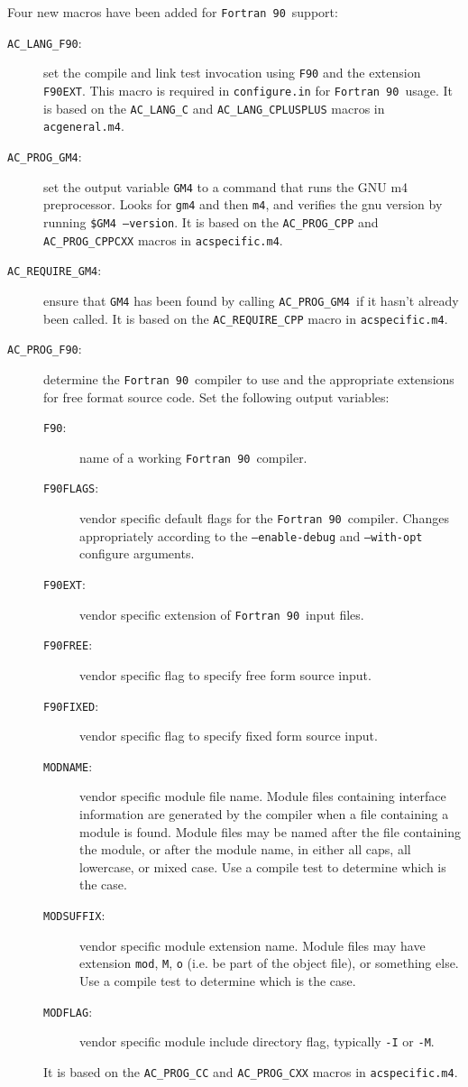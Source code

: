 \documentclass[11pt]{nmemo}
\newcommand{\fninety}{\texttt{Fortran~90}}
\newcommand{\langfninety}{\texttt{AC\_LANG\_F90}}
\newcommand{\progfninety}{\texttt{AC\_PROG\_F90}}
\newcommand{\requiregmfour}{\texttt{AC\_REQUIRE\_GM4}}
\newcommand{\proggmfour}{\texttt{AC\_PROG\_GM4}}
\begin{document}
Four new macros have been added for \fninety\ support:

\begin{description}
\item[\langfninety:] set the compile and link test invocation
using \texttt{F90} and the extension \texttt{F90EXT}.  This macro is
required in \texttt{configure.in} for \fninety\ usage.  It is based on
the \texttt{AC\_LANG\_C} and \texttt{AC\_LANG\_CPLUSPLUS} macros in
\texttt{acgeneral.m4}.

\item[\proggmfour:] set the output variable \texttt{GM4} to a command
that runs the GNU m4 preprocessor.  Looks for \texttt{gm4} and then
\texttt{m4}, and verifies the gnu version by running
\texttt{\${GM4}~--version}.  It is based on the \texttt{AC\_PROG\_CPP}
and \texttt{AC\_PROG\_CPPCXX} macros in \texttt{acspecific.m4}.

\item[\requiregmfour:] ensure that \texttt{GM4} has been found by
calling \proggmfour\ if it hasn't already been called.  It is based on
the \texttt{AC\_REQUIRE\_CPP} macro in \texttt{acspecific.m4}.

\item[\progfninety:] determine the \fninety\ compiler to use and the
appropriate extensions for free format source code.  Set the
following output variables:
\begin{description}
\item[\texttt{F90}:] name of a working \fninety\ compiler.
\item[\texttt{F90FLAGS}:] vendor specific default flags for the
\fninety\ compiler.  Changes appropriately according to the
\texttt{--enable-debug} and \texttt{--with-opt} configure arguments.
\item[\texttt{F90EXT}:] vendor specific extension of \fninety\ input files.
\item[\texttt{F90FREE}:] vendor specific flag to specify free form
source input. 
\item[\texttt{F90FIXED}:] vendor specific flag to specify fixed form
source input. 
\item[\texttt{MODNAME}:] vendor specific module file name.  Module
files containing interface information are generated by the compiler
when a file containing a module is found.  Module files may be named
after the file containing the module, or after the module name, in
either all caps, all lowercase, or mixed case.  Use a compile test to
determine which is the case.   
\item[\texttt{MODSUFFIX}:] vendor specific module extension name.
Module files may have extension \texttt{mod}, \texttt{M}, \texttt{o}
(i.e. be part of the object file), or something else.  Use a compile
test to determine which is the case.
\item[\texttt{MODFLAG}:] vendor specific module include directory
flag, typically \texttt{-I} or \texttt{-M}.
\end{description}
It is based on the \texttt{AC\_PROG\_CC} and \texttt{AC\_PROG\_CXX}
macros in \texttt{acspecific.m4}.
\end{description}
\end{document}
